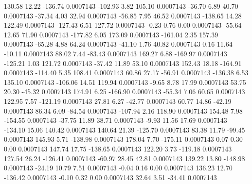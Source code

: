       130.58       12.22     -136.74     0.0007143
     -102.93        3.82      105.10     0.0007143
      -36.70        6.89       40.70     0.0007143
      -37.34        4.03       32.94     0.0007143
      -56.85        7.95       46.52     0.0007143
     -138.65       14.28      122.49     0.0007143
     -127.43        6.51      127.72     0.0007143
       -0.23        0.76        0.00     0.0007143
      -55.64       12.65       71.90     0.0007143
     -177.82        6.05      173.09     0.0007143
     -161.04        2.35      157.39     0.0007143
      -65.28        4.88       64.24     0.0007143
      -41.10        1.76       40.82     0.0007143
        0.16       11.64      -10.11     0.0007143
       88.02        7.44      -83.43     0.0007143
      169.27        6.88     -169.97     0.0007143
     -125.21        1.03      121.72     0.0007143
      -37.42       11.89       53.10     0.0007143
      152.43       18.18     -164.91     0.0007143
     -114.40        5.35      108.41     0.0007143
       60.86       27.17      -56.91     0.0007143
     -136.38        6.53      135.10     0.0007143
     -106.06       14.51      119.94     0.0007143
       -9.65        8.78       17.99     0.0007143
       53.75       20.30      -45.32     0.0007143
      174.91        6.25     -166.90     0.0007143
      -55.34        7.06       60.65     0.0007143
      122.95        7.57     -121.19     0.0007143
       27.81        6.27      -42.77     0.0007143
       60.77       14.86      -42.19     0.0007143
       86.34        6.09      -84.54     0.0007143
     -107.94        2.16      118.90     0.0007143
      154.48        7.98     -154.55     0.0007143
      -37.75       11.89       38.71     0.0007143
       -9.93       11.56       17.69     0.0007143
     -134.10       15.06      140.42     0.0007143
      140.64       21.39     -125.70     0.0007143
       83.38       11.79      -99.45     0.0007143
      145.93        5.71     -138.98     0.0007143
      178.04        7.70     -175.11     0.0007143
        0.07        0.30        0.00     0.0007143
      147.74       17.75     -138.65     0.0007143
      122.20        3.73     -119.18     0.0007143
      127.54       26.24     -126.41     0.0007143
      -60.97       28.45       42.81     0.0007143
      139.22       13.80     -148.98     0.0007143
      -24.19       10.79        7.51     0.0007143
       -0.04        0.16        0.00     0.0007143
      136.23       12.70     -136.42     0.0007143
       -0.10        0.32        0.00     0.0007143
       32.64        3.51      -34.41     0.0007143
